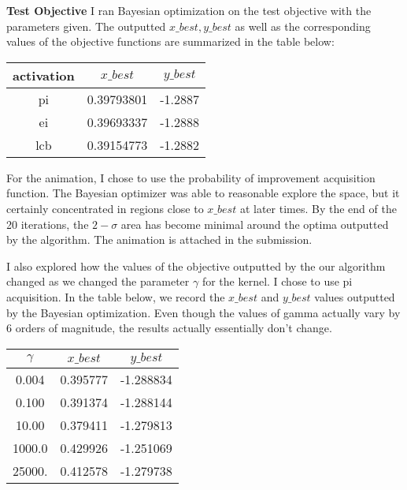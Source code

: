 \documentclass[10pt]{article}
\newcommand{\ybest}{y\_best}
\newcommand{\xbest}{x\_best}
\begin{document}
\begin{multicols}{2}

\textbf{Test Objective}
I ran Bayesian optimization on the test objective with the parameters given. The outputted $\xbest, \ybest$ as well as the corresponding values of the objective functions are summarized in the table below:
\begin{center}
\begin{tabular}{|c|c|c|} \hline
    activation & $\xbest$ & $\ybest$ \\ \hline
    pi & 0.39793801 & -1.2887 \\ \hline
    ei & 0.39693337 & -1.2888 \\ \hline 
    lcb &  0.39154773 & -1.2882  \\ \hline
\end{tabular}
\end{center}

For the animation, I chose to use the probability of improvement acquisition function. The Bayesian optimizer was able to reasonable explore the space, but it certainly concentrated in regions close to $\xbest$ at later times. By the end of the 20 iterations, the $2-\sigma$ area has become minimal around the optima outputted by the algorithm. The animation is attached in the submission.


I also explored how the values of the objective outputted by the our algorithm changed as we changed the parameter $\gamma$ for the kernel. I chose to use pi acquisition. In the table below, we record the $\xbest$ and $\ybest$ values outputted by the Bayesian optimization. Even though the values of gamma actually vary by 6 orders of magnitude, the results actually essentially don't change.

\begin{center}
    \begin{tabular}{|c|c|c|} \hline 
        $\gamma$ & $\xbest$ & $\ybest$ \\ \hline
        0.004 & 0.395777 & -1.288834 \\ \hline
        0.100 &  0.391374 & -1.288144 \\ \hline
        10.00 & 0.379411 & -1.279813 \\ \hline
        1000.0 & 0.429926 & -1.251069 \\ \hline
        25000. & 0.412578 & -1.279738 \\ \hline
    \end{tabular}
\end{center}


\end{multicols}
\end{document}
